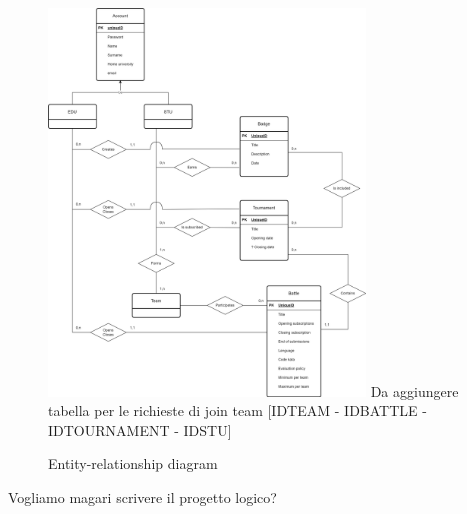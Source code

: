\begin{figure}[H]
    \centering
    \includegraphics[width=0.75\textwidth]{images/diagrams/er_diagram.png}
    {\color{red} Da aggiungere tabella per le richieste di join team [IDTEAM - IDBATTLE - IDTOURNAMENT - IDSTU]}
    \caption{Entity-relationship diagram}
    \label{fig:er_diagram}
\end{figure}

{\color{red} Vogliamo magari scrivere il progetto logico? \\}

